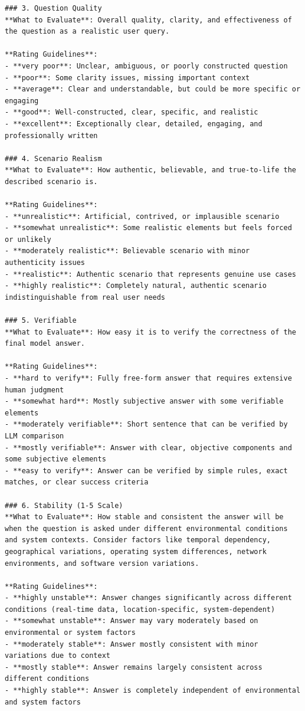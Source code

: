 \begin{verbatim}
### 3. Question Quality
**What to Evaluate**: Overall quality, clarity, and effectiveness of the question as a realistic user query.

**Rating Guidelines**:
- **very poor**: Unclear, ambiguous, or poorly constructed question
- **poor**: Some clarity issues, missing important context
- **average**: Clear and understandable, but could be more specific or engaging
- **good**: Well-constructed, clear, specific, and realistic
- **excellent**: Exceptionally clear, detailed, engaging, and professionally written

### 4. Scenario Realism
**What to Evaluate**: How authentic, believable, and true-to-life the described scenario is.

**Rating Guidelines**:
- **unrealistic**: Artificial, contrived, or implausible scenario
- **somewhat unrealistic**: Some realistic elements but feels forced or unlikely
- **moderately realistic**: Believable scenario with minor authenticity issues
- **realistic**: Authentic scenario that represents genuine use cases
- **highly realistic**: Completely natural, authentic scenario indistinguishable from real user needs

### 5. Verifiable
**What to Evaluate**: How easy it is to verify the correctness of the final model answer.

**Rating Guidelines**:
- **hard to verify**: Fully free-form answer that requires extensive human judgment
- **somewhat hard**: Mostly subjective answer with some verifiable elements
- **moderately verifiable**: Short sentence that can be verified by LLM comparison
- **mostly verifiable**: Answer with clear, objective components and some subjective elements
- **easy to verify**: Answer can be verified by simple rules, exact matches, or clear success criteria

### 6. Stability (1-5 Scale)
**What to Evaluate**: How stable and consistent the answer will be when the question is asked under different environmental conditions and system contexts. Consider factors like temporal dependency, geographical variations, operating system differences, network environments, and software version variations.

**Rating Guidelines**:
- **highly unstable**: Answer changes significantly across different conditions (real-time data, location-specific, system-dependent)
- **somewhat unstable**: Answer may vary moderately based on environmental or system factors
- **moderately stable**: Answer mostly consistent with minor variations due to context
- **mostly stable**: Answer remains largely consistent across different conditions
- **highly stable**: Answer is completely independent of environmental and system factors


\end{verbatim}
